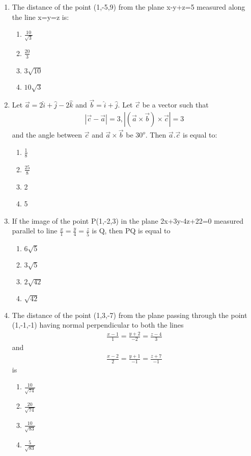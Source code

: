 \begin{enumerate}[label=\arabic*.,ref=\thesubsection.\theenumi]
\item The distance of the point (1,-5,9) from the plane x-y+z=5 measured along the line x=y=z is:
\begin{enumerate}
\item $\frac{10}{\sqrt{3}}$
\item $\frac{20}{3}$
\item $3\sqrt{10}$
\item $10\sqrt{3}$
\end{enumerate}

\item Let $\overrightarrow{a}=2\hat{i}+\hat{j}-2\hat{k}$ and $\overrightarrow{b}=\hat{i}+\hat{j}$. Let $\overrightarrow{c}$ be a vector such that
\begin{align*}
|\overrightarrow{c}-\overrightarrow{a}|=3, |(\overrightarrow{a} \times \overrightarrow{b}) \times \overrightarrow{c}|=3
\end{align*}
and the angle between $\overrightarrow{c}$ and $\overrightarrow{a} \times \overrightarrow{b}$ be $30^{o}$. Then $\overrightarrow{a}.\overrightarrow{c}$ is equal to:
\begin{enumerate}
\item $\frac{1}{8}$
\item $\frac{25}{8}$
\item 2
\item 5
\end{enumerate}

\item If the image of the point P(1,-2,3) in the plane 2x+3y-4z+22=0 measured parallel to line $\frac{x}{1}=\frac{y}{4}=\frac{z}{5}$ is Q, then PQ is equal to
\begin{enumerate}
\item $6\sqrt{5}$
\item $3\sqrt{5}$
\item $2\sqrt{42}$
\item $\sqrt{42}$
\end{enumerate}

\item The distance of the point (1,3,-7) from the plane passing through the point (1,-1,-1) having normal perpendicular to both the lines
\begin{align*}
\frac{x-1}{1}=\frac{y+2}{-2}=\frac{z-4}{3}
\end{align*}
and
\begin{align*}
\frac{x-2}{2}=\frac{y+1}{-1}=\frac{z+7}{-1}
\end{align*}
is
\begin{enumerate}
\item $\frac{10}{\sqrt{74}}$
\item $\frac{20}{\sqrt{74}}$
\item $\frac{10}{\sqrt{83}}$
\item $\frac{5}{\sqrt{83}}$
\end{enumerate}


\end{enumerate}
